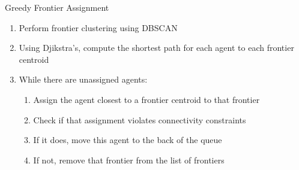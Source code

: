 \documentclass[conference]{IEEEtran}
\begin{document}
\begin{algorithm}
\caption{Greedy Frontier Assignment}
\begin{enumerate}
    \item Perform frontier clustering using DBSCAN
    \item Using Djikstra's, compute the shortest path for each agent to each frontier centroid
    \item While there are unassigned agents:
    \begin{enumerate}
        \item Assign the agent closest to a frontier centroid to that frontier
        \item Check if that assignment violates connectivity constraints
        \item If it does, move this agent to the back of the queue
        \item If not, remove that frontier from the list of frontiers
    \end{enumerate}
\end{enumerate}
\end{algorithm}




\end{document}
